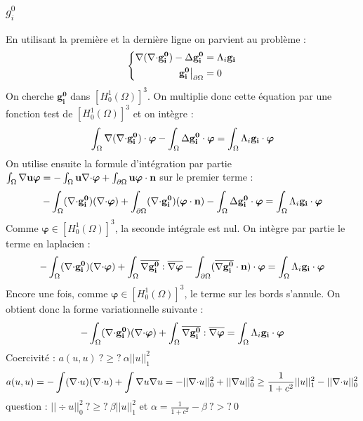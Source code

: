 \subsubsection{$g_i^0$}
En utilisant la première et la dernière ligne on parvient au problème :
\begin{equation}\label{gi0}
\left\{\begin{aligned}
{\nabla}({\nabla\cdot} \mathbf{g_i^0})-{\Delta} \mathbf{g_i^0} &= \Lambda_i\mathbf{g_i}\\
\mathbf{g_i^0}{\big\rvert_{\partial\Omega}} &= 0
\end{aligned}\right.
\end{equation}
On cherche $\mathbf{g_i^0}$ dans $[H^1_0(\Omega)]^3$. On multiplie donc cette équation par une fonction test de $[H^1_0(\Omega)]^3$ et on intègre :
\[ \int_\Omega {\nabla}({\nabla\cdot} \mathbf{g_i^0})\cdot\bm{\varphi} - \int_\Omega {\Delta} \mathbf{g_i^0}\cdot\bm{\varphi} = \int_\Omega \Lambda_i\mathbf{g_i}\cdot\bm{\varphi} \]
On utilise ensuite la formule d'intégration par partie $\int_\Omega {\nabla}{\mathbf{u}}\bm{\varphi} = -\int_\Omega \mathbf{u}{\nabla\cdot}\bm{\varphi} + \int_{\partial\Omega} \mathbf{u}\bm{\varphi}\cdot \mathbf{n}$ sur le premier terme :
\[ -\int_\Omega ({\nabla\cdot} \mathbf{g_i^0})({\nabla\cdot}\bm{\varphi}) + \int_{\partial\Omega} ({\nabla\cdot} \mathbf{g_i^0})(\bm{\varphi}\cdot \mathbf{n}) - \int_\Omega {\Delta} \mathbf{g_i^0}\cdot\bm{\varphi} = \int_\Omega \Lambda_i\mathbf{g_i}\cdot\bm{\varphi} \]
Comme $\bm{\varphi}\in [H^1_0(\Omega)]^3$, la seconde intégrale est nul. On intègre par partie le terme en laplacien :
\[ -\int_\Omega ({\nabla\cdot} \mathbf{g_i^0})({\nabla\cdot}\bm{\varphi}) + \int_\Omega \overline{{\nabla} \mathbf{g_i^0}}:\overline{{\nabla}\bm{\varphi}} - \int_{\partial\Omega} (\overline{{\nabla} \mathbf{g_i^0}}\cdot \mathbf{n})\cdot\bm{\varphi} = \int_\Omega \Lambda_i\mathbf{g_i}\cdot\bm{\varphi} \]
Encore une fois, comme $\bm{\varphi}\in [H^1_0(\Omega)]^3$, le terme sur les bords s'annule. On obtient donc la forme variationnelle suivante :
\begin{equation}\label{fvgi0}
-\int_\Omega ({\nabla\cdot} \mathbf{g_i^0})({\nabla\cdot}\bm{\varphi}) + \int_\Omega \overline{{\nabla} \mathbf{g_i^0}}:\overline{{\nabla}\bm{\varphi}} = \int_\Omega \Lambda_i\mathbf{g_i}\cdot\bm{\varphi}
\end{equation}
Coercivité : $a(u,u)\ ?\geq?\ \alpha||u||^2_1$\\
\[ a(u,u)=-\int({\nabla\cdot} u)({\nabla\cdot} u) + \int {\nabla} u{\nabla} u = -||{\nabla\cdot} u||_0^2 + ||{\nabla} u||^2_0 \geq \frac{1}{1+c^2}||u||^2_1 - ||{\nabla\cdot} u||^2_0 \]
question : $||\div u||^2_0\ ?\geq?\ \beta ||u||^2_1$ et $\alpha=\frac{1}{1+c^2}-\beta\ ?>?\ 0$\\

